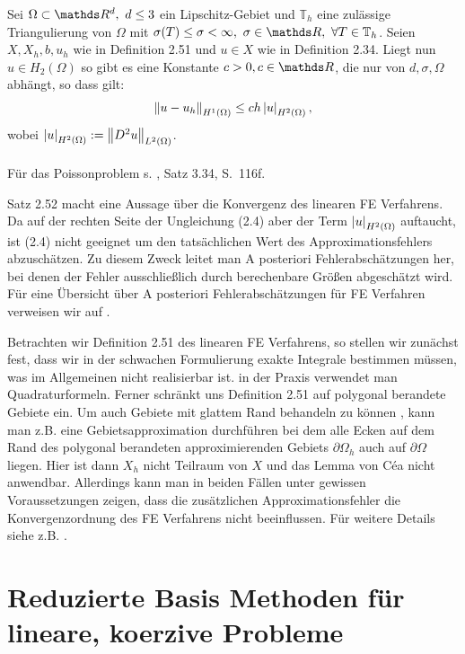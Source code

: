 Sei $\Omega\subset\R^d,~d\le 3$ ein Lipschitz-Gebiet und $\mathbb{T}_h$ eine zulässige Triangulierung von $\Omega$ mit $\sigma(T)\le \sigma<\infty,~\sigma\in \R,~\forall T\in \mathbb{T}_h$.
Seien $X,X_h,b,u_h$ wie in Definition 2.51 und $u\in X$ wie in Definition 2.34.
Liegt nun $u\in H_2(\Omega)$ so gibt es eine Konstante $c>0,c\in \R$, die nur von $d,\sigma,\Omega$ abhängt, so dass gilt:
\begin{align}
\left\Vert u-u_h\right\Vert_{H^1(\Omega)}\le ch\left\vert u\right\vert_{H^2(\Omega)},
\end{align}
wobei $\left\vert u\right\vert_{H^2(\Omega)}:= \left\Vert D^2u\right\Vert_{L^2(\Omega)}$.\\

\\
Für das Poissonproblem s. \cite{Dziuk10}, Satz 3.34, S.~116f.

Satz 2.52 macht eine Aussage über die Konvergenz des linearen FE Verfahrens.
Da auf der rechten Seite der Ungleichung (2.4) aber der Term $\left\vert u\right\vert_{H^2(\Omega)}$ auftaucht, ist (2.4) nicht geeignet um den tatsächlichen Wert des Approximationsfehlers abzuschätzen.
Zu diesem Zweck leitet man A posteriori Fehlerabschätzungen her, bei denen der Fehler ausschließlich durch berechenbare Größen abgeschätzt wird.
Für eine Übersicht über A posteriori Fehlerabschätzungen für FE Verfahren verweisen wir auf \cite{Ver13}.

Betrachten wir Definition 2.51 des linearen FE Verfahrens, so stellen wir zunächst fest, dass wir in der schwachen Formulierung exakte Integrale bestimmen müssen, was im Allgemeinen nicht realisierbar ist.
in der Praxis verwendet man Quadraturformeln.
Ferner schränkt uns Definition 2.51 auf polygonal berandete Gebiete ein.
Um auch Gebiete mit glattem Rand behandeln zu können , kann man z.B. eine Gebietsapproximation durchführen bei dem alle Ecken auf dem Rand des polygonal berandeten approximierenden Gebiets $\partial\Omega_h$ auch auf $\partial\Omega$ liegen.
Hier ist dann $X_h$ nicht Teilraum von $X$ und das Lemma von Céa nicht anwendbar.
Allerdings kann man in beiden Fällen unter gewissen Voraussetzungen zeigen, dass die zusätzlichen Approximationsfehler die Konvergenzordnung des FE Verfahrens nicht beeinflussen.
Für weitere Details siehe z.B. \cite{Dziuk10,BreSco08}.
\newpage
\section{Reduzierte Basis Methoden für lineare, koerzive Probleme}

